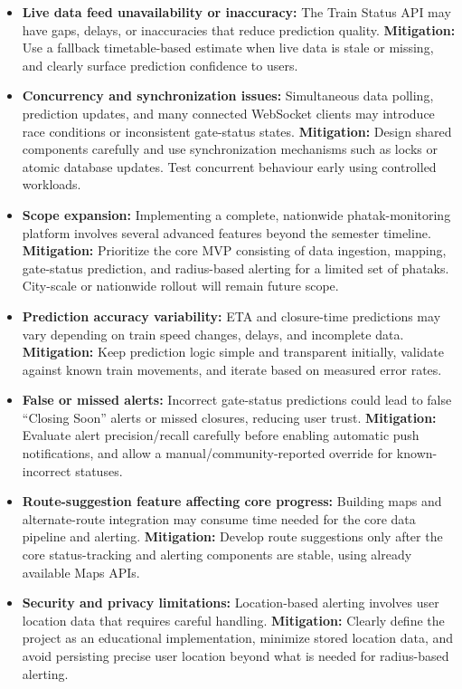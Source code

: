 \documentclass[11pt,a4paper]{article}
\begin{document}
\begin{itemize}

    \item \textbf{Live data feed unavailability or inaccuracy:} The Train Status API may have gaps, delays, or inaccuracies that reduce prediction quality.  
    \textbf{Mitigation:} Use a fallback timetable-based estimate when live data is stale or missing, and clearly surface prediction confidence to users.

    \item \textbf{Concurrency and synchronization issues:} Simultaneous data polling, prediction updates, and many connected WebSocket clients may introduce race conditions or inconsistent gate-status states.  
    \textbf{Mitigation:} Design shared components carefully and use synchronization mechanisms such as locks or atomic database updates. Test concurrent behaviour early using controlled workloads.

    \item \textbf{Scope expansion:} Implementing a complete, nationwide phatak-monitoring platform involves several advanced features beyond the semester timeline.  
    \textbf{Mitigation:} Prioritize the core MVP consisting of data ingestion, mapping, gate-status prediction, and radius-based alerting for a limited set of phataks. City-scale or nationwide rollout will remain future scope.

    \item \textbf{Prediction accuracy variability:} ETA and closure-time predictions may vary depending on train speed changes, delays, and incomplete data.  
    \textbf{Mitigation:} Keep prediction logic simple and transparent initially, validate against known train movements, and iterate based on measured error rates.

    \item \textbf{False or missed alerts:} Incorrect gate-status predictions could lead to false ``Closing Soon'' alerts or missed closures, reducing user trust.  
    \textbf{Mitigation:} Evaluate alert precision/recall carefully before enabling automatic push notifications, and allow a manual/community-reported override for known-incorrect statuses.

    \item \textbf{Route-suggestion feature affecting core progress:} Building maps and alternate-route integration may consume time needed for the core data pipeline and alerting.  
    \textbf{Mitigation:} Develop route suggestions only after the core status-tracking and alerting components are stable, using already available Maps APIs.

    \item \textbf{Security and privacy limitations:} Location-based alerting involves user location data that requires careful handling.  
    \textbf{Mitigation:} Clearly define the project as an educational implementation, minimize stored location data, and avoid persisting precise user location beyond what is needed for radius-based alerting.

\end{itemize}
\end{document}
